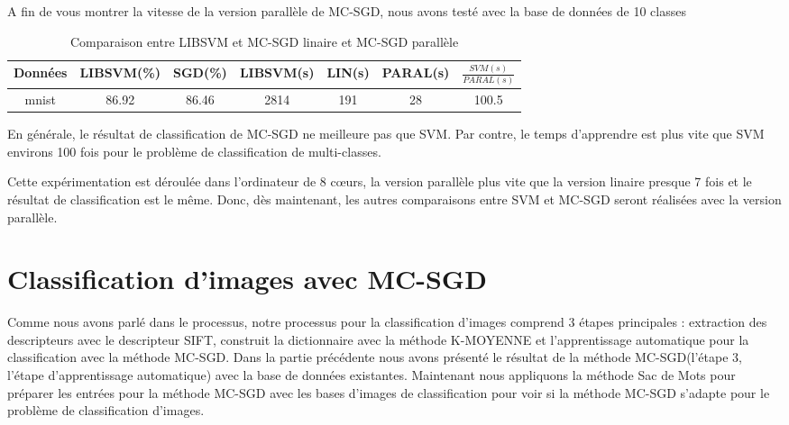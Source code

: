 A fin de vous montrer la vitesse de la version parallèle de MC-SGD, nous avons testé avec la base de données de 10 classes\\


\pagebreak
\begin{table}
\begin{center}
    \begin{tabular}{ | c | c | c | c | c | c | c |}
    \hline
    Données & LIBSVM(\%) & SGD(\%) & LIBSVM(s) & LIN(s) & PARAL(s) & $\frac{SVM(s)}{PARAL(s)}$ \\ \hline
    
    mnist & 86.92 & 86.46 & 2814 & 191 & 28 & 100.5 \\ \hline
    
    \end{tabular}
\end{center}
\caption{Comparaison entre LIBSVM et MC-SGD linaire et MC-SGD parallèle}
\label{tab:pmcsvm}
\end{table}


En générale, le résultat de classification de MC-SGD ne meilleure pas que SVM. Par contre, le temps d'apprendre est plus vite que SVM environs 100 fois pour le problème de classification de multi-classes.

Cette expérimentation est déroulée dans l'ordinateur de 8 cœurs, la version parallèle plus vite que la version linaire presque 7 fois et le résultat de classification est le même. Donc, dès maintenant, les autres comparaisons entre SVM et MC-SGD seront réalisées avec la version parallèle.


\section{Classification d'images avec MC-SGD}
Comme nous avons parlé dans le processus, notre processus pour la classification d'images comprend 3 étapes principales : extraction des descripteurs avec le descripteur SIFT, construit la dictionnaire avec la méthode K-MOYENNE et l'apprentissage automatique pour la classification avec la méthode MC-SGD. Dans la partie précédente nous avons présenté le résultat de la méthode MC-SGD(l'étape 3, l'étape d'apprentissage automatique) avec la base de données existantes. Maintenant nous appliquons la méthode Sac de Mots pour préparer les entrées pour la méthode MC-SGD avec les bases d'images de classification pour voir si la méthode MC-SGD s'adapte pour le problème de classification d'images.

